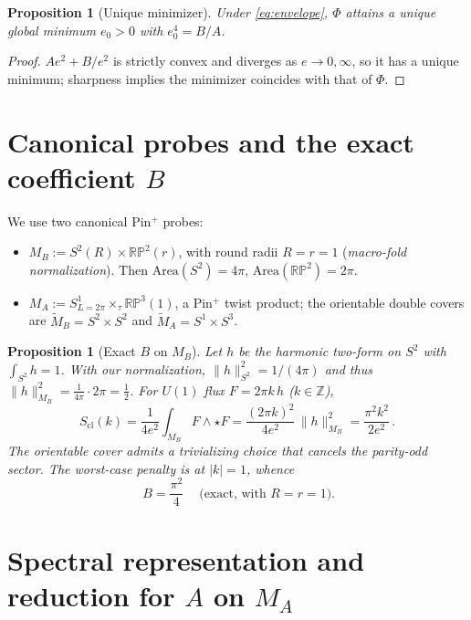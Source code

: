 \documentclass[11pt]{article}
\newtheorem{proposition}[theorem]{Proposition}
\theoremstyle{definition}
\theoremstyle{remark}
\begin{document}
\begin{proposition}[Unique minimizer]\label{prop:min}
Under \eqref{eq:envelope}, $\Phi$ attains a unique global minimum $e_0>0$ with $e_0^4=B/A$.
\end{proposition}
\begin{proof}
$A e^2+B/e^2$ is strictly convex and diverges as $e\to 0,\infty$, so it has a unique minimum; sharpness implies the minimizer coincides with that of $\Phi$.
\end{proof}

\section{Canonical probes and the exact coefficient $B$}
We use two canonical Pin$^+$ probes:
\begin{itemize}[leftmargin=2em]
\item \textbf{$M_B:=S^2(R)\times \mathbb{RP}^2(r)$}, with round radii $R=r=1$ (\emph{macro-fold normalization}). Then $\mathrm{Area}(S^2)=4\pi$, $\mathrm{Area}(\mathbb{RP}^2)=2\pi$.
\item \textbf{$M_A:=S^1_{L=2\pi}\times_\tau \mathbb{RP}^3(1)$}, a Pin$^+$ twist product; the orientable double covers are $\widetilde M_B=S^2\times S^2$ and $\widetilde M_A=S^1\times S^3$.
\end{itemize}

\begin{proposition}[Exact $B$ on $M_B$]\label{prop:Bexact}
Let $h$ be the harmonic two-form on $S^2$ with $\int_{S^2}h=1$. With our normalization, $\|h\|^2_{S^2}=1/(4\pi)$ and thus $\|h\|^2_{M_B}=\frac{1}{4\pi}\cdot 2\pi=\frac{1}{2}$. For $U(1)$ flux $F=2\pi k\,h$ ($k\in\mathbb Z$),
\begin{equation}
S_{\mathrm{cl}}(k)=\frac{1}{4e^2}\int_{M_B} F\wedge\star F=\frac{(2\pi k)^2}{4e^2}\,\|h\|^2_{M_B}=\frac{\pi^2 k^2}{2 e^2}\,.
\end{equation}
The orientable cover admits a trivializing choice that cancels the parity-odd sector. The worst-case penalty is at $|k|=1$, whence
\begin{equation}\label{eq:Bvalue}
\boxed{\ B=\frac{\pi^2}{4}\ }\quad\text{(exact, with $R=r=1$).}
\end{equation}
\end{proposition}

\section{Spectral representation and reduction for $A$ on $M_A$}
\end{document}
